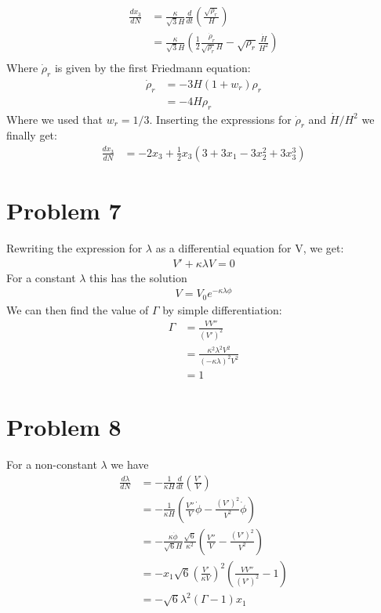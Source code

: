\documentclass[reprint,english,notitlepage]{revtex4-1}  %
\begin{document}
\begin{align}
	\frac{dx_3}{dN} &= \frac{\kappa}{\sqrt{3}H}\frac{d}{dt}\left(\frac{\sqrt{\rho_r}}{H}\right)\\
									&= \frac{\kappa}{\sqrt{3}H}\left(\frac{1}{2}\frac{\dot{\rho}_r}
									{\sqrt{\rho_r}H} - \sqrt{\rho_r}\frac{\dot{H}}{H^2}\right)\\
\end{align}
Where $\dot{\rho}_r$ is given by the first Friedmann equation:
\begin{align}
	\dot{\rho}_r &= -3 H (1 + w_r)\rho_r \\
							 &= -4 H\rho_r
\end{align}
Where we used that $w_r=1/3$. Inserting the expressions for $\dot{\rho}_r$ and
$\dot{H}/H^2$ we finally get:
\begin{align}
	\frac{dx_3}{dN} &=-2x_3 + \frac{1}{2}x_3\left(3+3x_1 - 3x_2^2 + 3x_3^3\right)
\end{align}

\section{Problem 7}
Rewriting the expression for $\lambda$ as a differential equation for V, we get:
\begin{align}
	V' + \kappa \lambda V = 0
\end{align}
For a constant $\lambda$ this has the solution
\begin{align}
	V = V_0 e^{-\kappa\lambda\phi}
\end{align}
We can then find the value of $\Gamma$ by simple differentiation:
\begin{align}
	\Gamma &= \frac{V V''}{(V')^2} \\
				 &= \frac{\kappa^2\lambda^2 V^2}{(-\kappa\lambda)^2 V^2} \\
				 &= 1
\end{align}
\section{Problem 8}
For a non-constant $\lambda$ we have
\begin{align}
	\frac{d\lambda}{dN} &= -\frac{1}{\kappa H}\frac{d}{dt}\left( \frac{V'}{V}\right) \\
											&= -\frac{1}{\kappa H}\left(\frac{V''}{V}\dot{\phi} -  \frac{(V')^2}{V^2}\dot{\phi}\right) \\
											&= -\frac{\kappa\dot{\phi}}{\sqrt{6}H}\frac{\sqrt{6}}{\kappa^2}
											\left(\frac{V''}{V} - \frac{(V')^2}{V^2}\right) \\
											&= -x_{1}\sqrt{6}\left(\frac{V'}{\kappa V}\right)^2
													\left(\frac{V V''}{(V')^2} - 1 \right) \\
											&= - \sqrt{6} \lambda^2 (\Gamma - 1) x_1
\end{align}
\end{document}
